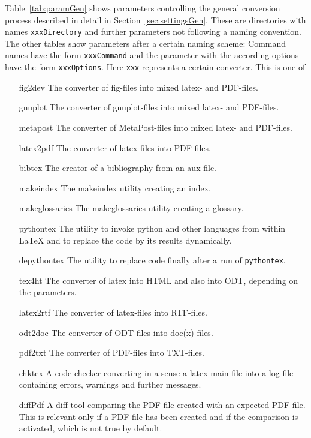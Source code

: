 Table~\ref{tab:paramGen} 
shows parameters controlling the general conversion process 
described in detail in Section~\ref{sec:settingsGen}. 
These are directories with names \texttt{xxxDirectory} 
and further parameters not following a naming convention. 
The other tables show parameters after a certain naming scheme: 
Command names have the form \texttt{xxxCommand} 
and the parameter with the according options have the form \texttt{xxxOptions}. 
Here \texttt{xxx} represents a certain converter. 
This is one of 
%
\begin{itemize}
\item[fig2dev]
The converter of fig-files into mixed latex- and PDF-files. 
\item[gnuplot]
The converter of gnuplot-files into mixed latex- and PDF-files. 
\item[metapost]
The converter of MetaPost-files into mixed latex- and PDF-files.
\item[latex2pdf]
The converter of latex-files into PDF-files. 
\item[bibtex]
The creator of a bibliography from an aux-file.
\item[makeindex]
The makeindex utility creating an index. 
\item[makeglossaries]
The makeglossaries utility creating a glossary. 
\item[pythontex]
The utility to invoke python and other languages from within \LaTeX{} 
and to replace the code by its results dynamically. 
\item[depythontex]
The utility to replace code finally after a run of \texttt{pythontex}. 
\item[tex4ht]
The converter of latex into HTML and also into ODT, 
depending on the parameters. 
\item[latex2rtf]
The converter of latex-files into RTF-files. 
\item[odt2doc]
The converter of ODT-files into doc(x)-files. %
\item[pdf2txt]
The converter of PDF-files into TXT-files. 
\item[chktex]
A code-checker converting in a sense a latex main file into a log-file 
containing errors, warnings and further messages. 
\item[diffPdf]
A diff tool comparing the PDF file created with an expected PDF file. 
This is relevant only if a PDF file has been created 
and if the comparison is activated, which is not true by default. 
\end{itemize}


